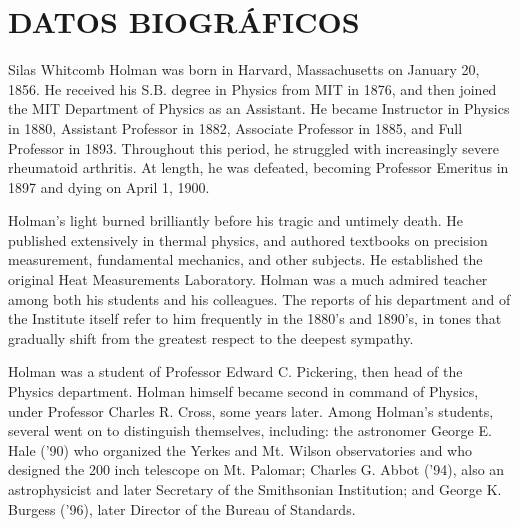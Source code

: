 

\chapter*{DATOS BIOGRÁFICOS}

Silas Whitcomb Holman was born in Harvard, Massachusetts on January 20, 1856. He received his S.B. degree in Physics from MIT in 1876, and then joined the MIT Department of Physics as an Assistant. He became Instructor in Physics in 1880, Assistant Professor in 1882, Associate Professor in 1885, and Full Professor in 1893. Throughout this period, he struggled with increasingly severe rheumatoid arthritis. At length, he was defeated, becoming Professor Emeritus in 1897 and dying on April 1, 1900.

Holman's light burned brilliantly before his tragic and untimely death. He published extensively in thermal physics, and authored textbooks on precision measurement, fundamental mechanics, and other subjects. He established the original Heat Measurements Laboratory. Holman was a much admired teacher among both his students and his colleagues. The reports of his department and of the Institute itself refer to him frequently in the 1880's and 1890's, in tones that gradually shift from the greatest respect to the deepest sympathy.

Holman was a student of Professor Edward C. Pickering, then head of the Physics department. Holman himself became second in command of Physics, under Professor Charles R. Cross, some years later. Among Holman's students, several went on to distinguish themselves, including: the astronomer George E. Hale ('90) who organized the Yerkes and Mt. Wilson observatories and who designed the 200 inch telescope on Mt. Palomar; Charles G. Abbot ('94), also an astrophysicist and later Secretary of the Smithsonian Institution; and George K. Burgess ('96), later Director of the Bureau of Standards. 